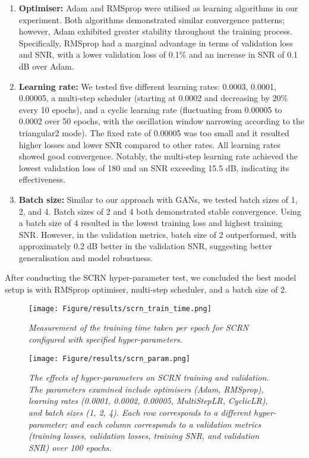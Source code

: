 \begin{enumerate}
	\item \textbf{Optimiser:} Adam and RMSprop were utilised as learning algorithms in our experiment. Both algorithms demonstrated similar convergence patterns; however, Adam exhibited greater stability throughout the training process. Specifically, RMSprop had a marginal advantage in terms of validation loss and SNR, with a lower validation loss of 0.1\% and an increase in SNR of 0.1 dB over Adam.
	
	\item \textbf{Learning rate:} We tested five different learning rates: 0.0003, 0.0001, 0.00005, a multi-step scheduler (starting at 0.0002 and decreasing by 20\% every 10 epochs), and a cyclic learning rate (fluctuating from 0.00005 to 0.0002 over 50 epochs, with the oscillation window narrowing according to the triangular2 mode). The fixed rate of 0.00005 was too small and it resulted higher losses and lower SNR compared to other rates. All learning rates showed good convergence. Notably, the multi-step learning rate achieved the lowest validation loss of 180 and an SNR exceeding 15.5 dB, indicating its effectiveness.
	
	\item \textbf{Batch size:} Similar to our approach with GANs, we tested batch sizes of 1, 2, and 4. Batch sizes of 2 and 4 both demonstrated stable convergence. Using a batch size of 4 resulted in the lowest training loss and highest training SNR. However, in the validation metrics, batch size of 2 outperformed, with approximately 0.2 dB better in the validation SNR, suggesting better generalisation and model robustness.
\end{enumerate}

\noindent After conducting the SCRN hyper-parameter test, we concluded the best model setup is with RMSprop optimiser, multi-step scheduler, and a batch size of 2.


\begin{figure}[h]
	\centering
	\texttt{[image: Figure/results/scrn\_train\_time.png]} %
	\caption{\textit{Measurement of the training time taken per epoch for SCRN configured with specified hyper-parameters.}}
	\label{fig:scrn_time}
\end{figure}

\begin{figure}[h]
	\centering
	\texttt{[image: Figure/results/scrn\_param.png]} %
	\caption{\textit{The effects of hyper-parameters on SCRN training and validation. The parameters examined include optimisers (Adam, RMSprop), learning rates (0.0001, 0.0002, 0.00005, MultiStepLR, CyclicLR), and batch sizes (1, 2, 4). Each row corresponds to a different hyper-parameter; and each column corresponds to a validation metrics (training losses, validation losses, training SNR, and validation SNR) over 100 epochs.}}
	\label{fig:scrn_param}
\end{figure}

